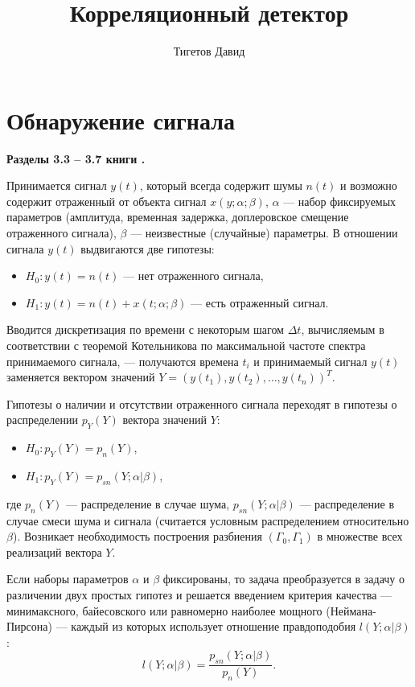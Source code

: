 \documentclass[a4paper,12pt]{article}
\begin{document}
    \title{Корреляционный детектор}
    \author{Тигетов Давид}
    \maketitle

    \tableofcontents


    \section{Обнаружение сигнала}

    \textbf{Разделы 3.3 -- 3.7 книги \cite{SCHIRMAN}.}

    Принимается сигнал $y(t)$, который всегда содержит шумы $n(t)$ и возможно содержит отраженный от объекта сигнал $x(y; \alpha; \beta)$,
    $\alpha$ --- набор фиксируемых параметров (амплитуда, временная задержка, доплеровское смещение отраженного сигнала), $\beta$ --- неизвестные (случайные)
    параметры. В отношении сигнала $y(t)$ выдвигаются две гипотезы:
    \begin{itemize}
        \item $H_0: y(t) = n(t)$ --- нет отраженного сигнала,
        \item $H_1: y(t) = n(t) + x(t; \alpha; \beta)$ --- есть отраженный сигнал.
    \end{itemize}

    Вводится дискретизация по времени с некоторым шагом $\Delta t$, вычисляемым в соответствии с теоремой Котельникова по максимальной частоте спектра принимаемого
    сигнала, --- получаются времена $t_i$ и принимаемый сигнал $y(t)$ заменяется вектором значений $Y = \left ( y(t_1), y(t_2), \dots, y(t_n) \right )^T$.

    Гипотезы о наличии и отсутствии отраженного сигнала переходят в гипотезы о распределении $p_Y(Y)$ вектора значений $Y$:
    \begin{itemize}
        \item $H_0: p_Y(Y) = p_n(Y)$,
        \item $H_1: p_Y(Y) = p_{sn}(Y; \alpha | \beta)$,
    \end{itemize}
    где $p_n(Y)$ --- распределение в случае шума, $p_{sn}(Y; \alpha | \beta)$ --- распределение в случае смеси шума и сигнала (считается условным распределением
    относительно $\beta$). Возникает необходимость построения разбиения $\left ( \Gamma_0, \Gamma_1 \right )$ в множестве всех реализаций вектора $Y$.

    Если наборы параметров $\alpha$ и $\beta$ фиксированы, то задача преобразуется в задачу о различении двух простых гипотез и решается введением критерия
    качества --- минимаксного, байесовского или равномерно наиболее мощного (Неймана-Пирсона) --- каждый из которых использует отношение правдоподобия
    $l(Y; \alpha | \beta)$:
    \[
        l(Y; \alpha | \beta) = \frac{p_{sn}(Y; \alpha | \beta)}{p_n(Y)} .
    \]
\end{document}
